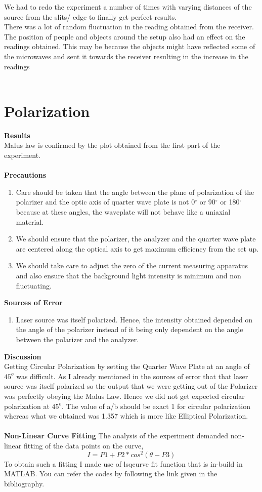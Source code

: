 \documentclass[12pt]{report}
\begin{document}
We had to redo the experiment a number of times with varying distances of the source from the slits/ edge to finally get perfect results.\\
There was a lot of random fluctuation in the reading obtained from the receiver.\\ 
The position of people and objects around the setup also had an effect on the readings obtained. This may be because the objects might have reflected some of the microwaves and sent it towards the receiver resulting in the increase in the readings\\\\
\section{Polarization}
\textbf{Results}\\
Malus law is confirmed by the plot obtained from the first part of the experiment. \\\\
\textbf{Precautions}
\begin{enumerate}
	\item Care should be taken that the angle between the plane of polarization of the  polarizer and the optic axis of quarter wave plate is not 0$^\circ$ or 90$^\circ$ or 180$^\circ$ because at these angles, the waveplate will not behave like a uniaxial material.
	\item We should ensure that the polarizer, the analyzer and the quarter wave plate are centered along the optical axis to get maximum efficiency from the set up.
	\item We should take care to adjust the zero of the current measuring apparatus and also ensure that the background light intensity is minimum and non fluctuating.
\end{enumerate}
\textbf{Sources of Error}
\begin{enumerate}
	\item Laser source was itself polarized. Hence, the intensity obtained depended on the angle of the polarizer instead of it being only dependent on the angle between the polarizer and the analyzer.
\end{enumerate}
\textbf{Discussion}\\
Getting Circular Polarization by setting the Quarter Wave Plate at an angle of $45^o$ was difficult. As I already mentioned in the sources of error that that laser source was itself polarized so the output that we were getting out of the Polarizer was perfectly obeying the Malus Law. Hence we did not get expected circular polarization at $45^o$. The value of a/b should be exact 1 for circular polarization whereas what we obtained was 1.357 which is more like Elliptical Polarization.\\ \\
\textbf{Non-Linear Curve Fitting}
The analysis of the experiment demanded non-linear fitting of the data points on the curve,
\[I=P1+P2*cos^2{(\theta-P3)}\] 
To obtain such a fitting I made use of lsqcurve fit function that is in-build in MATLAB. You can refer the codes by following the link given in the bibliography.  
\\\\
\end{document}

